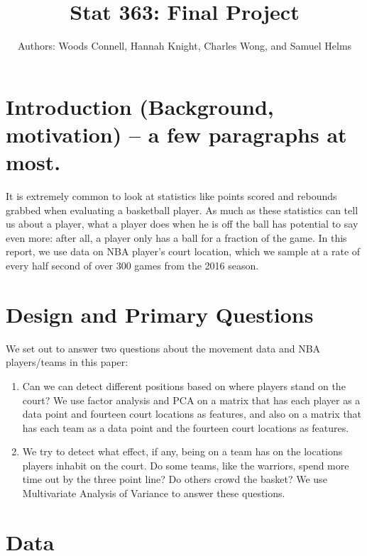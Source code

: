 \documentclass[]{article}
\title{Stat 363: Final Project}
\author{Authors: Woods Connell, Hannah Knight, Charles Wong, and Samuel Helms}
\date{}
\begin{document}
\maketitle

{
\setcounter{tocdepth}{3}
\tableofcontents
}
\hypertarget{introduction-background-motivation-a-few-paragraphs-at-most.}{%
\section{Introduction (Background, motivation) -- a few paragraphs at
most.}\label{introduction-background-motivation-a-few-paragraphs-at-most.}}

It is extremely common to look at statistics like points scored and
rebounds grabbed when evaluating a basketball player. As much as these
statistics can tell us about a player, what a player does when he is off
the ball has potential to say even more: after all, a player only has a
ball for a fraction of the game. In this report, we use data on NBA
player's court location, which we sample at a rate of every half second
of over 300 games from the 2016 season.

\hypertarget{design-and-primary-questions}{%
\section{Design and Primary
Questions}\label{design-and-primary-questions}}

We set out to answer two questions about the movement data and NBA
players/teams in this paper:

\begin{enumerate}
\def\labelenumi{\arabic{enumi}.}
\item
  Can we can detect different positions based on where players stand on
  the court? We use factor analysis and PCA on a matrix that has each
  player as a data point and fourteen court locations as features, and
  also on a matrix that has each team as a data point and the fourteen
  court locations as features.
\item
  We try to detect what effect, if any, being on a team has on the
  locations players inhabit on the court. Do some teams, like the
  warriors, spend more time out by the three point line? Do others crowd
  the basket? We use Multivariate Analysis of Variance to answer these
  questions.
\end{enumerate}

\hypertarget{data}{%
\section{Data}\label{data}}
\end{document}
